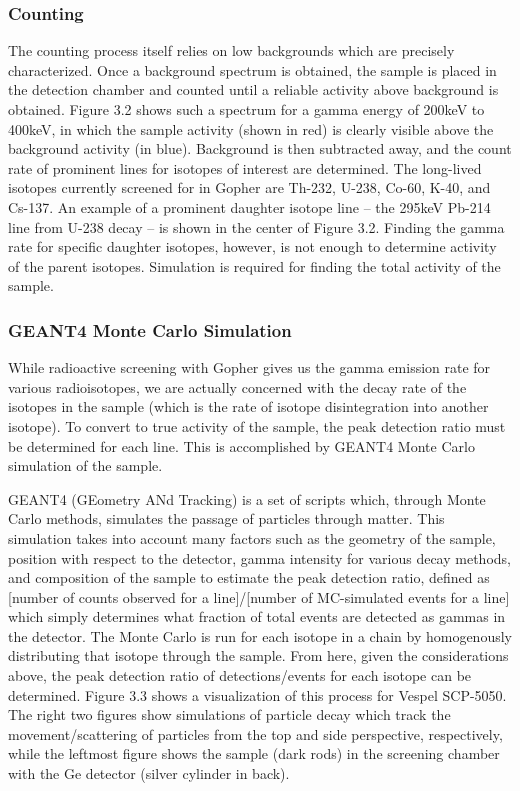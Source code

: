 \documentclass{report}
\begin{document}
\subsubsection{Counting}
The counting process itself relies on low backgrounds which are precisely characterized. Once a background spectrum is obtained, the sample is placed in the detection chamber and counted until a reliable activity above background is obtained. Figure 3.2 shows such a spectrum for a gamma energy of 200keV to 400keV, in which the sample activity (shown in red) is clearly visible above the background activity (in blue). Background is then subtracted away, and the count rate of prominent lines for isotopes of interest are determined. The long-lived isotopes currently screened for in Gopher are Th-232, U-238, Co-60, K-40, and Cs-137. An example of a prominent daughter isotope line -- the 295keV Pb-214 line from U-238 decay -- is shown in the center of Figure 3.2. Finding the gamma rate for specific daughter isotopes, however, is not enough to determine activity of the parent isotopes. Simulation is required for finding the total activity of the sample.

\subsubsection{GEANT4 Monte Carlo Simulation}
While radioactive screening with Gopher gives us the gamma emission rate for various radioisotopes, we are actually concerned with the decay rate of the isotopes in the sample (which is the rate of isotope disintegration into another isotope). To convert to true activity of the sample, the peak detection ratio must be determined for each line. This is accomplished by GEANT4 Monte Carlo simulation of the sample.

GEANT4 (GEometry ANd Tracking) is a set of scripts which, through Monte Carlo methods, simulates the passage of particles through matter. This simulation takes into account many factors such as the geometry of the sample, position with respect to the detector, gamma intensity for various decay methods, and composition of the sample to estimate the peak detection ratio, defined as [number of counts observed for a line]/[number of MC-simulated events for a line] which simply determines what fraction of total events are detected as gammas in the detector. The Monte Carlo is run for each isotope in a chain by homogenously distributing that isotope through the sample. From here, given the considerations above, the peak detection ratio of detections/events for each isotope can be determined. Figure 3.3 shows a visualization of this process for Vespel SCP-5050. The right two figures show simulations of particle decay which track the movement/scattering of particles from the top and side perspective, respectively, while the leftmost figure shows the sample (dark rods) in the screening chamber with the Ge detector (silver cylinder in back).
\end{document}
